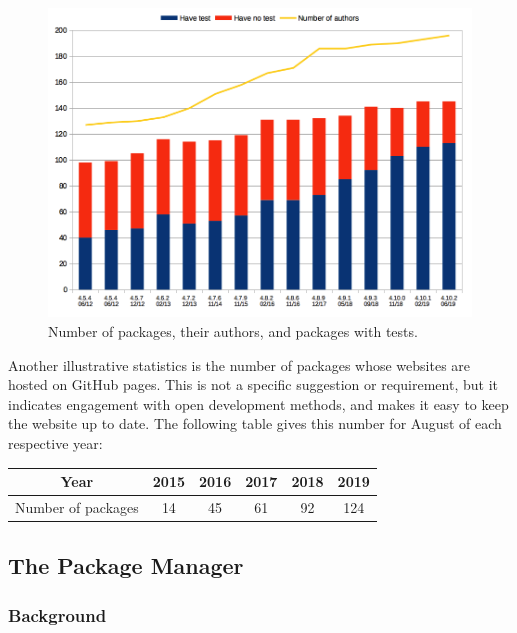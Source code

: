 \begin{figure}[!ht]
    \centering
    \includegraphics[width=\textwidth]{images/gap-package-tests}
    \caption{Number of \GAP packages, their authors, and packages with tests.}
    \label{fig:gap-package-tests}
\end{figure}

Another illustrative statistics is the number of \GAP packages
whose websites are hosted on GitHub pages. This is not a
specific suggestion or requirement, but it indicates engagement with
open development  methods, and makes it easy to keep the website up to date.
The following table gives this number for August of each respective year:

\begin{center}
\begin{tabular}{| c | c | c | c | c | c |} 
\hline
Year & 2015 & 2016 & 2017 & 2018 & 2019 \\
\hline
Number of packages & 14 & 45 & 61 & 92 & 124 \\
\hline
\end{tabular}
\end{center}

\subsection{The \GAP Package Manager}\label{pkg-manager}

\subsubsection{Background}

